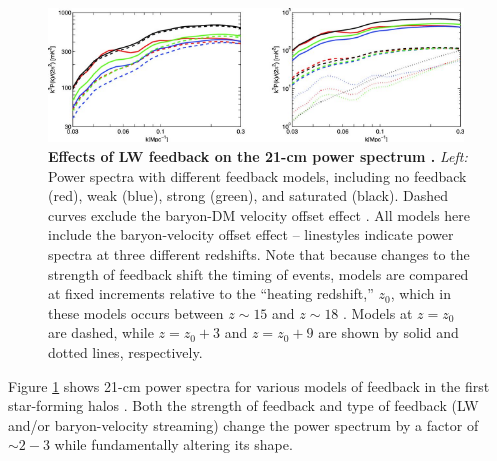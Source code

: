 \begin{figure}[]
\begin{center}
\includegraphics[width=0.98\textwidth]{Mirocha/fialkov2014_fig6.pdf}
\end{center}
\caption{{\bf Effects of LW feedback on the 21-cm power spectrum \cite{Fialkov2013}.} \textit{Left:} Power spectra with different feedback models, including no feedback (red), weak (blue), strong (green), and saturated (black). Dashed curves exclude the baryon-DM velocity offset effect \cite{Tseliakovich2010}.  All models here include the baryon-velocity offset effect -- linestyles indicate power spectra at three different redshifts. Note that because changes to the strength of feedback shift the timing of events, models are compared at fixed increments relative to the ``heating redshift,'' $z_0$, which in these models occurs between $z\sim 15$ and $z\sim 18$ \cite{Fialkov2013}. Models at $z=z_0$ are dashed, while $z=z_0+3$ and $z=z_0+9$ are shown by solid and dotted lines, respectively.}
\label{fig:LWfeedback}
\end{figure}

Figure \ref{fig:LWfeedback} shows 21-cm power spectra for various models of feedback in the first star-forming halos \cite{Fialkov2013}. Both the strength of feedback and type of feedback (LW and/or baryon-velocity streaming) change the power spectrum by a factor of $\sim 2-3$ while fundamentally altering its shape. 

